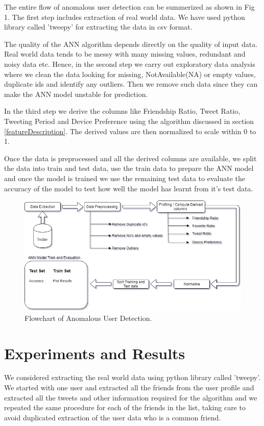 \documentclass[conference]{IEEEtran}
\begin{document}
The entire flow of anomalous user detection can be summerized as shown in Fig 1. The first step includes extraction of real world data. 
We have used python library called 'tweepy' for extracting the data in csv format.

The quality of the ANN algorithm depends directly on the quality of input data. Real world data tends to be messy with many missing values, 
redundant and noisy data etc. Hence, in the second step we carry out exploratory data analysis where we clean the data looking for missing, 
NotAvailable(NA) or empty values, duplicate ids and identify any outliers. Then we remove such data since they can make the ANN model unstable for prediction.

In the third step we derive the columns like Friendship Ratio, Tweet Ratio, Tweeting Period and Device Preference using the algorithm discussed in section 
\ref{featureDescription}. The derived values are then normalized to scale within 0 to 1.

Once the data is preprocessed and all the derived columns are available, we split the data into train and test data, 
use the train data to prepare the ANN model and once the model is trained we use the remaining test data to evaluate the 
accuracy of the model to test how well the model has learnt from it's test data.

\begin{figure}[h!]
	\includegraphics[scale=0.7]{Methodology1}
	\caption{Flowchart of Anomalous User Detection.}
\end{figure}

\section{Experiments and Results}
	  We considered extracting the real world data using python library called 'tweepy'. We started with one user and extracted all the friends 
	  from the user profile and extracted all the tweets and other information required for the algorithm and we repeated the same procedure for each 
	  of the friends in the list, taking care to avoid duplicated extraction of the user data who is a common friend. 
	   
\end{document}
